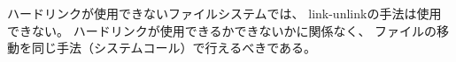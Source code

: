\documentclass[a4j,twcolumn,11pt,nomag]{ltjarticle}      %
\begin{document}
\begin{enumerate}
\begin{enumerate}
ハードリンクが使用できないファイルシステムでは、
link-unlinkの手法は使用できない。
ハードリンクが使用できるかできないかに関係なく、
ファイルの移動を同じ手法（システムコール）で行えるべきである。
\end{enumerate}


\end{enumerate}
\end{document}
